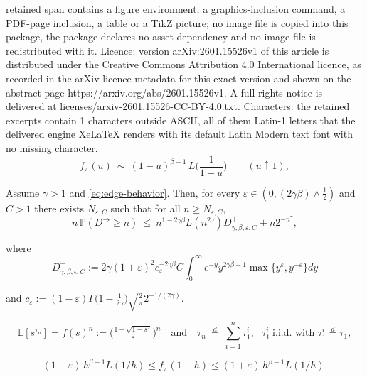 \documentclass[10pt,a4paper]{amsart}
\newcommand{\EE}{\mathbb{E}}
\newcommand{\PP}{\mathbb{P}}
\begin{document}
retained span contains a figure environment, a graphics-inclusion command, a PDF-page inclusion, a table or a TikZ picture; no image file is copied into this package, the package declares no asset dependency and no image file is redistributed with it. Licence: version arXiv:2601.15526v1 of this article is distributed under the Creative Commons Attribution 4.0 International licence, as recorded in the arXiv licence metadata for this exact version and shown on the abstract page https://arxiv.org/abs/2601.15526v1. A full rights notice is delivered at licenses/arxiv-2601.15526-CC-BY-4.0.txt. Characters: the retained excerpts contain 1 characters outside ASCII, all of them Latin-1 letters that the delivered engine XeLaTeX renders with its default Latin Modern text font with no missing character.
\begin{equation}\label{eq:edge-behavior}
f_\pi(u)\ \sim\ (1-u)^{\beta-1}\,L\!\Big(\frac{1}{1-u}\Big)\qquad (u\uparrow 1),
\end{equation}

\begin{proposition}\label{prop:upper-gamma>1-EN-eps}
Assume \(\gamma>1\) and \eqref{eq:edge-behavior}. Then, for every $\varepsilon\in(0,(2\gamma\beta)\wedge\tfrac{1}{2})$ and \(C>1\) there exists $N_{\varepsilon,C}$ such that for all $n\ge N_{\varepsilon,C}$,
\begin{equation}\label{eq:upper-gamma>1-EN-eps}
n\,\PP(D^{\rightarrow}\ge n)\ \le\ n^{1-2\gamma\beta}L(n^{2\gamma})D^+_{\gamma,\beta,\varepsilon,C}+n2^{-n^\gamma},
\end{equation}


where 
\[
D^+_{\gamma,\beta,\epsilon,C}:=2\gamma (1+\varepsilon)^{2} c_{\varepsilon}^{-2\gamma\beta}C\int_{0}^{\infty}e^{-y}y^{2\gamma\beta-1}\max\{y^{\varepsilon},y^{-\varepsilon}\}dy
\]

and \(c_{\varepsilon}:=(1-\varepsilon)\Gamma\!\bigl(1-\tfrac{1}{2\gamma}\bigr)\sqrt{\tfrac{2}{\pi}}2^{-1/(2\gamma)}\). 


\end{proposition}

\begin{equation}\label{sumindp}
\EE[s^{\tau_n}]=f(s)^n:=\Big(\tfrac{1-\sqrt{1-s^2}}{s}\Big)^{\!n}
\quad\text{and}\quad
\tau_n\ \stackrel{d}{=}\ \sum_{i=1}^{n} \tau_1^{i},\ \ \ \tau_1^{i}\ \text{i.i.d. with }\tau_1^{i}\stackrel{d}{=}\tau_1,
\end{equation}

\begin{equation}\label{eq:edge-band}
(1-\varepsilon)\,h^{\beta-1}L(1/h)
\le f_\pi(1-h)\le
(1+\varepsilon)\,h^{\beta-1}L(1/h).
\end{equation}
\end{document}
